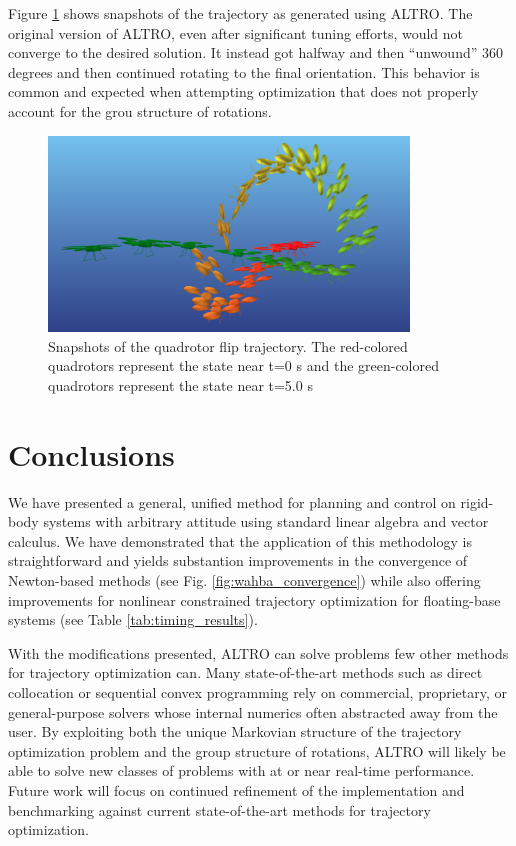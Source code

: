 \documentclass[letterpaper, 10 pt, conference]{ieeeconf}  %
\begin{document}
	    Figure \ref{fig:quad_flip} shows snapshots of the trajectory as generated using
        ALTRO. The original version of ALTRO, even after significant tuning efforts,
        would not converge to the desired solution. It instead got halfway and then ``unwound''
        360 degrees and then continued rotating to the final orientation. This behavior
        is common and expected when attempting optimization that does not properly account 
        for the grou structure of rotations.

            \begin{figure}[t]
                \centering
                \includegraphics[height=5.2cm,trim={0 0cm 0 0},clip]{figures/quadflip.png}
                \caption{Snapshots of the quadrotor flip trajectory. The
                    red-colored quadrotors represent the state near t=0 s and the
                    green-colored quadrotors represent the state near t=5.0 s
                }
                \label{fig:quad_flip}
            \end{figure}    
    

\section{Conclusions} \label{sec:conclusion}
    We have presented a general, unified method for planning and control on rigid-body
    systems with arbitrary attitude using standard linear algebra and vector calculus.
    We have demonstrated that the application of this methodology is straightforward and
    yields substantion improvements in the convergence of Newton-based methods (see Fig. 
    \ref{fig:wahba_convergence}) while also offering improvements for nonlinear constrained
    trajectory optimization for floating-base systems (see Table \ref{tab:timing_results}).
    
    With the modifications presented, ALTRO can solve problems few other methods for 
    trajectory optimization can. Many state-of-the-art methods such as direct 
    collocation or sequential convex programming rely on commercial, proprietary, or 
    general-purpose solvers whose internal numerics often abstracted away from the user. 
    By exploiting both the unique Markovian structure of the trajectory optimization problem
    and the group structure of rotations, ALTRO will likely be able to solve new classes of 
    problems with at or near real-time performance. Future work will focus on continued 
    refinement of the implementation and benchmarking against current state-of-the-art 
    methods for trajectory optimization.
\end{document}
